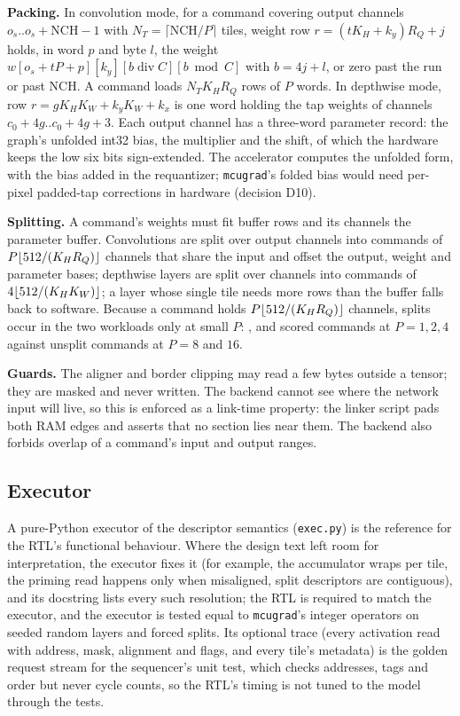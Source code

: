 \documentclass[journal]{IEEEtran}
\begin{document}
\textbf{Packing.} In convolution mode, for a command covering output channels $o_s..o_s{+}\mathrm{NCH}{-}1$ with $N_T=\lceil \mathrm{NCH}/P\rceil$ tiles, weight row $r = (tK_H + k_y)R_Q + j$ holds, in word $p$ and byte $l$, the weight $w[o_s{+}tP{+}p][k_y][b \operatorname{div} C][b \bmod C]$ with $b=4j+l$, or zero past the run or past NCH. A command loads $N_T K_H R_Q$ rows of $P$ words. In depthwise mode, row $r = gK_HK_W + k_yK_W + k_x$ is one word holding the tap weights of channels $c_0{+}4g..c_0{+}4g{+}3$. Each output channel has a three-word parameter record: the graph's unfolded int32 bias, the multiplier and the shift, of which the hardware keeps the low six bits sign-extended. The accelerator computes the unfolded form, with the bias added in the requantizer; \texttt{mcugrad}'s folded bias would need per-pixel padded-tap corrections in hardware (decision D10).

\textbf{Splitting.} A command's weights must fit \WbufRows{} buffer rows and its channels the parameter buffer. Convolutions are split over output channels into commands of $P\lfloor 512/(K_H R_Q)\rfloor$ channels that share the input and offset the output, weight and parameter bases; depthwise layers are split over channels into commands of $4\lfloor 512/(K_HK_W)\rfloor$; a layer whose single tile needs more rows than the buffer falls back to software. Because a command holds $P\lfloor 512/(K_HR_Q)\rfloor$ channels, splits occur in the two workloads only at small $P$: \MOneRowsPone{}, \MOneRowsPtwo{} and \MOneRowsPfour{} scored commands at $P=1,2,4$ against \MOneRowsPeight{} unsplit commands at $P=8$ and $16$.

\textbf{Guards.} The aligner and border clipping may read a few bytes outside a tensor; they are masked and never written. The backend cannot see where the network input will live, so this is enforced as a link-time property: the linker script pads both RAM edges and asserts that no section lies near them. The backend also forbids overlap of a command's input and output ranges.

\subsection{Executor}
A pure-Python executor of the descriptor semantics (\texttt{exec.py}) is the reference for the RTL's functional behaviour. Where the design text left room for interpretation, the executor fixes it (for example, the accumulator wraps per tile, the priming read happens only when misaligned, split descriptors are contiguous), and its docstring lists every such resolution; the RTL is required to match the executor, and the executor is tested equal to \texttt{mcugrad}'s integer operators on seeded random layers and forced splits. Its optional trace (every activation read with address, mask, alignment and flags, and every tile's metadata) is the golden request stream for the sequencer's unit test, which checks addresses, tags and order but never cycle counts, so the RTL's timing is not tuned to the model through the tests.
\end{document}
